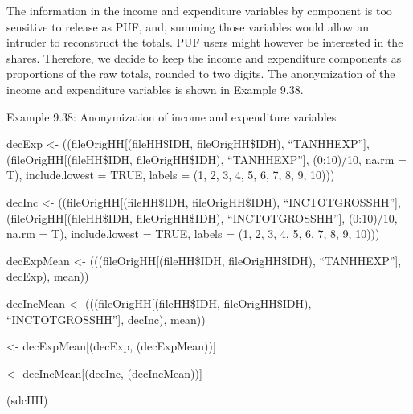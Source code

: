 \documentclass[letterpaper,10pt,english]{sphinxmanual}
\begin{document}
The information in the income and expenditure variables by component is
too sensitive to release as PUF, and, summing those variables would
allow an intruder to reconstruct the totals. PUF users might however be
interested in the shares. Therefore, we decide to keep the income and
expenditure components as proportions of the raw totals, rounded to two
digits. The anonymization of the income and expenditure variables is
shown in Example 9.38.

Example 9.38: Anonymization of income and expenditure variables

\begin{DUlineblock}{0em}
\item[] 
\item[] decExp \textless{}-
((fileOrigHH{[}(fileHH\$IDH,
fileOrigHH\$IDH), “TANHHEXP”{]},
(fileOrigHH{[}(fileHH\$IDH, fileOrigHH\$IDH),
“TANHHEXP”{]}, (0:10)/10, na.rm = T), include.lowest = TRUE, labels =
(1, 2, 3, 4, 5, 6, 7, 8, 9, 10)))
\item[] decInc \textless{}-
((fileOrigHH{[}(fileHH\$IDH,
fileOrigHH\$IDH), “INCTOTGROSSHH”{]},
(fileOrigHH{[}(fileHH\$IDH, fileOrigHH\$IDH),
“INCTOTGROSSHH”{]}, (0:10)/10, na.rm = T), include.lowest = TRUE, labels
= (1, 2, 3, 4, 5, 6, 7, 8, 9, 10)))
\item[] 
\item[] decExpMean \textless{}-
(((fileOrigHH{[}(fileHH\$IDH,
fileOrigHH\$IDH), “TANHHEXP”{]}, decExp), mean))
\item[] decIncMean \textless{}-
(((fileOrigHH{[}(fileHH\$IDH,
fileOrigHH\$IDH), “INCTOTGROSSHH”{]}, decInc), mean))
\item[] 
\item[]  \textless{}- decExpMean{[}(decExp,
(decExpMean)){]}
\item[]  \textless{}- decIncMean{[}(decInc,
(decIncMean)){]}
\item[] 
\item[] (sdcHH)
\end{DUlineblock}
\end{document}
